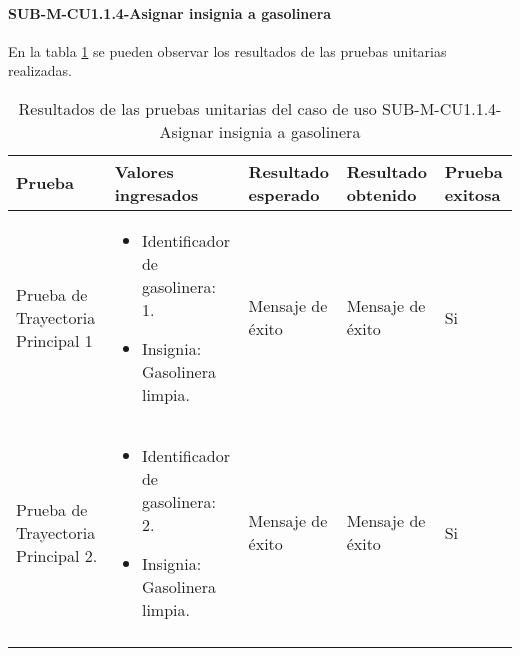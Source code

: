 \paragraph{SUB-M-CU1.1.4-Asignar insignia a gasolinera}\label{SUB-M-CU1.1.4:Pruebas}
En la tabla \ref{pruebas_unitarias_sub-m-cu1.1.4} se pueden observar los resultados de las pruebas unitarias realizadas.
\begin{longtable}{|M{2cm}| M{4.5cm}|M{3cm}|M{3cm}|M{1.5cm}|}
	\hline
	\textbf{Prueba} & \textbf{Valores ingresados} & \textbf{Resultado esperado} & \textbf{Resultado obtenido} & \textbf{Prueba exitosa} \\ \hline
	Prueba de Trayectoria Principal 1& 
	\begin{itemize}
		\item Identificador de gasolinera: 1.
		\item Insignia: Gasolinera limpia.
	\end{itemize}
	& Mensaje de éxito  & Mensaje de éxito & Si \\ \hline
	Prueba de Trayectoria Principal 2.& 
	\begin{itemize}
		\item Identificador de gasolinera: 2.
		\item Insignia: Gasolinera limpia.
	\end{itemize}
	& Mensaje de éxito & Mensaje de éxito & Si \\ \hline
	\caption{Resultados de las pruebas unitarias del caso de uso SUB-M-CU1.1.4-Asignar insignia a gasolinera}
	\label{pruebas_unitarias_sub-m-cu1.1.4}
\end{longtable}
